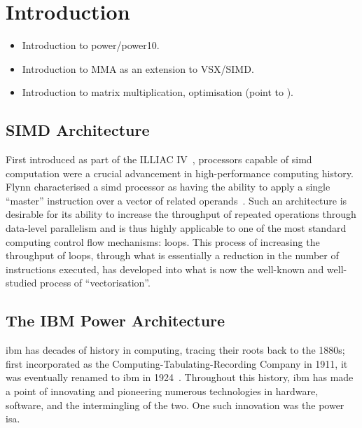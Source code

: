 \documentclass[\main/thesis.tex]{subfiles}
\begin{document}
\chapter{Introduction}
\label{cha:intro}



\begin{itemize}
  \item Introduction to \gls{power}/\gls{power10}.
  \item Introduction to MMA as an extension to VSX/SIMD.
  \item Introduction to matrix multiplication, optimisation (point to ).
\end{itemize}

\section{SIMD Architecture}
First introduced as part of the ILLIAC IV~\autocite{barnes1968illiac}, processors capable of \gls{simd} computation were a crucial advancement in high-performance computing history.
Flynn characterised a \gls{simd} processor as having the ability to apply a single ``master'' instruction over a vector of related operands~\autocite{flynn1972some}.
Such an architecture is desirable for its ability to increase the throughput of repeated operations through data-level parallelism and is thus highly applicable to one of the most standard computing control flow mechanisms: loops.
This process of increasing the throughput of loops, through what is essentially a reduction in the number of instructions executed, has developed into what is now the well-known and well-studied process of ``\gls{vectorisation}''.

\section{The IBM Power Architecture}
\Gls{ibm} has decades of history in computing, tracing their roots back to the 1880s; first incorporated as the Computing-Tabulating-Recording Company in 1911, it was eventually renamed to \gls{ibm} in 1924~\autocite{ibmarchive}.
Throughout this history, \gls{ibm} has made a point of innovating and pioneering numerous technologies in hardware, software, and the intermingling of the two.
One such innovation was the \gls{power} \gls{isa}.
\end{document}
